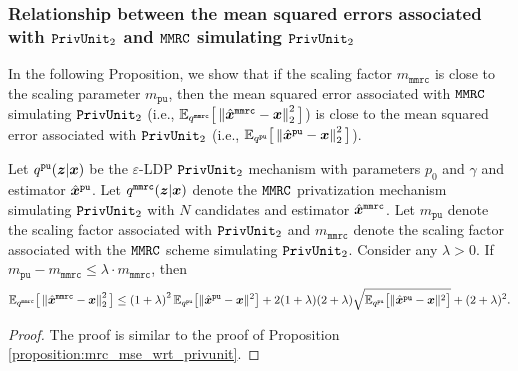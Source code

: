 \subsubsection{Relationship between the mean squared errors associated with \texorpdfstring{$\texttt{PrivUnit}_2$}{PrivUnit} and \texorpdfstring{$\texttt{MMRC}$}{MMRC} simulating \texorpdfstring{$\texttt{PrivUnit}_2$}{PrivUnit}}\label{appendix:mmrc_pu_scaling_mse}
In the following Proposition,
we show that if the scaling factor $m_{\texttt{mmrc}}$ is close to the scaling parameter $m_{\texttt{pu}}$, then the mean squared error associated with $\texttt{MMRC}$ simulating $\texttt{PrivUnit}_2$ (i.e., $\mathbb{E}_{q^{\texttt{mmrc}}} \big[ \left\lVert  \hat{{\boldsymbol{x}}}^\texttt{mmrc} - {\boldsymbol{x}} \right\rVert^2_2  \big]$) is close to the mean squared error associated with $\texttt{PrivUnit}_2$ (i.e., $\mathbb{E}_{q^{\texttt{pu}}} \big[ \left\lVert  \hat{{\boldsymbol{x}}}^\texttt{pu} - {\boldsymbol{x}} \right\rVert^2_2  \big]$).
\begin{proposition}\label{proposition:mmrc_mse_wrt_privunit}
Let $q^{\texttt{pu}}({\boldsymbol{z}} | {\boldsymbol{x}})$ be the  $\varepsilon$-LDP \emph{$\texttt{PrivUnit}_2$} mechanism with parameters $p_0$ and $\gamma$ and estimator $\hat{{\boldsymbol{x}}}^{\texttt{pu}}$. Let $q^{\texttt{mmrc}}({\boldsymbol{z}}|{\boldsymbol{x}})$ denote the \emph{$\texttt{MMRC}$} privatization mechanism simulating \emph{$\texttt{PrivUnit}_2$} with $N$ candidates and estimator $\hat{{\boldsymbol{x}}}^{\texttt{mmrc}}$.
Let $m_{\texttt{pu}}$ denote the scaling factor  associated with \emph{$\texttt{PrivUnit}_2$} and $m_\texttt{mmrc}$ denote the scaling factor  associated with the \emph{$\texttt{MMRC}$} scheme simulating \emph{$\texttt{PrivUnit}_2$}. Consider any $\lambda > 0$. If $m_{\texttt{pu}} - m_\texttt{mmrc} \leq \lambda \cdot m_\texttt{mmrc}$, then 
  \begin{align}
    \mathbb{E}_{q^{\texttt{mmrc}}} \big[ \left\lVert  \hat{{\boldsymbol{x}}}^\texttt{mmrc} - {\boldsymbol{x}} \right\rVert^2_2  \big]  \leq  \left( 1+\lambda \right)^2  \mathbb{E}_{q^{\texttt{pu}}}\big[\|\hat{{\boldsymbol{x}}}^{\texttt{pu}} - {\boldsymbol{x}}\|^2\big] + 2(1+\lambda)(2+\lambda) \sqrt{\mathbb{E}_{q^{\texttt{pu}}}\big[\|\hat{{\boldsymbol{x}}}^{\texttt{pu}} - {\boldsymbol{x}}\|^2\big]} + (2+\lambda)^2.
\end{align}
\end{proposition}
\begin{proof}
The proof is similar to the proof of Proposition \ref{proposition:mrc_mse_wrt_privunit}.
\end{proof}

